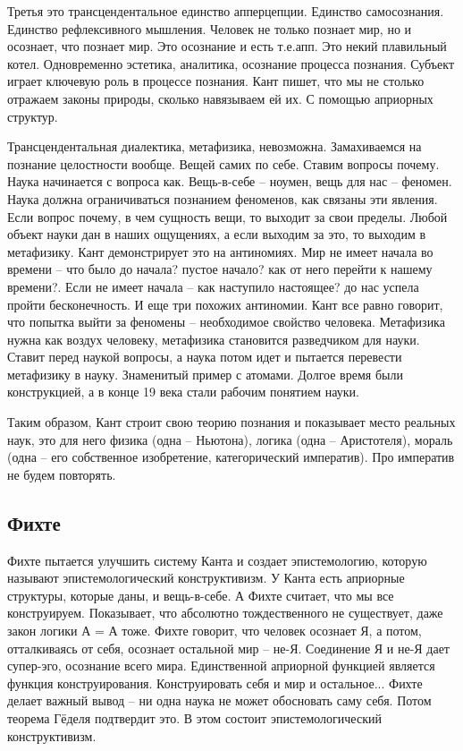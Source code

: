 \documentclass[a4paper, 12pt]{article}
\begin{document}
Третья это трансцендентальное единство апперцепции. Единство 
самосознания. Единство рефлексивного мышления. Человек не только познает 
мир, но и осознает, что познает мир. Это осознание и есть т.е.апп. Это 
некий плавильный котел. Одновременно эстетика, аналитика, осознание 
процесса познания. Субъект играет ключевую роль в процессе познания. 
Кант пишет, что мы не столько отражаем законы природы, сколько 
навязываем ей их. С помощью априорных структур.

Трансцендентальная диалектика, метафизика, невозможна. Замахиваемся на 
познание целостности вообще. Вещей самих по себе. Ставим вопросы почему. 
Наука начинается с вопроса как. Вещь-в-себе -- ноумен, вещь для нас -- 
феномен. Наука должна ограничиваться познанием феноменов, как связаны 
эти явления. Если вопрос почему, в чем сущность вещи, то выходит за свои 
пределы. Любой объект науки дан в наших ощущениях, а если выходим за 
это, то выходим в метафизику. Кант демонстрирует это на антиномиях. Мир 
не имеет начала во времени -- что было до начала? пустое начало? как от 
него перейти к нашему времени?. Если не имеет начала -- как наступило 
настоящее? до нас успела пройти бесконечность. И еще три похожих 
антиномии. Кант все равно говорит, что попытка выйти за феномены -- 
необходимое свойство человека. Метафизика нужна как воздух человеку, 
метафизика становится разведчиком для науки. Ставит перед наукой 
вопросы, а наука потом идет и пытается перевести метафизику в науку. 
Знаменитый пример с атомами. Долгое время были конструкцией, а в конце 
19 века стали рабочим понятием науки.

Таким образом, Кант строит свою теорию познания и показывает место 
реальных наук, это для него физика (одна -- Ньютона), логика (одна -- 
Аристотеля), мораль (одна -- его собственное изобретение, категорический 
императив). Про императив не будем повторять.

\subsection{Фихте}
Фихте пытается улучшить систему Канта и создает эпистемологию, которую 
называют эпистемологический конструктивизм. У Канта есть априорные 
структуры, которые даны, и вещь-в-себе. А Фихте считает, что мы все 
конструируем. Показывает, что абсолютно тождественного не существует, 
даже закон логики А = А тоже. Фихте говорит, что человек осознает Я, 
а потом, отталкиваясь от себя, осознает остальной мир -- не-Я. 
Соединение Я и не-Я дает супер-эго, осознание всего мира. Единственной 
априорной функцией является функция конструирования. Конструировать себя 
и мир и остальное... Фихте делает важный вывод -- ни одна наука не может 
обосновать саму себя. Потом теорема Гёделя подтвердит это. В этом 
состоит эпистемологический конструктивизм.
\end{document}
